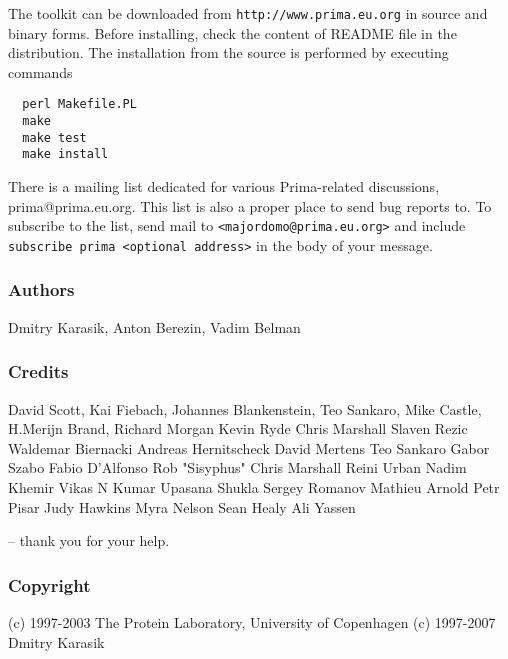 \documentclass{report}
\begin{document}
The toolkit can be downloaded from \texttt{http://www.prima.eu.org} in
source and binary forms. Before installing, check the content of README file
in the distribution. The installation from the source is performed by
executing commands
\begin{verbatim}
  perl Makefile.PL
  make
  make test
  make install
\end{verbatim}

There is a mailing list dedicated for various Prima-related discussions, 
prima@prima.eu.org. This list is also a proper place to send bug reports to. 
To subscribe to the list, send mail to \texttt{<majordomo@prima.eu.org>} and 
include \texttt{subscribe prima <optional address>} in the body of your message.

\subsubsection{Authors}

Dmitry Karasik,
Anton Berezin,
Vadim Belman

\subsubsection{Credits}

David Scott,
Kai Fiebach,
Johannes Blankenstein,
Teo Sankaro,
Mike Castle,
H.Merijn Brand,
Richard Morgan
Kevin Ryde
Chris Marshall
Slaven Rezic
Waldemar Biernacki
Andreas Hernitscheck
David Mertens
Teo Sankaro
Gabor Szabo
Fabio D'Alfonso
Rob "Sisyphus"
Chris Marshall
Reini Urban
Nadim Khemir
Vikas N Kumar
Upasana Shukla
Sergey Romanov
Mathieu Arnold
Petr Pisar
Judy Hawkins
Myra Nelson
Sean Healy
Ali Yassen

-- thank you for your help.

\subsubsection{Copyright}

(c) 1997-2003 The Protein Laboratory, University of Copenhagen
(c) 1997-2007 Dmitry Karasik
\end{document}
